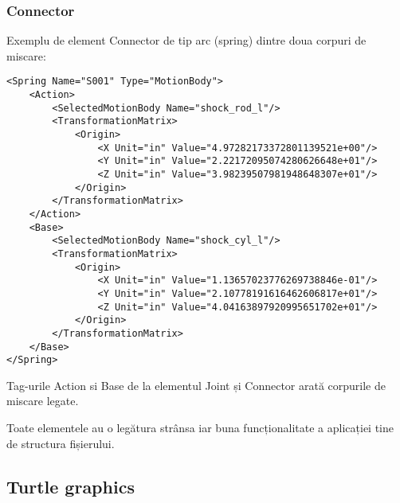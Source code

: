 \subsubsection{Connector}
Exemplu de element Connector de tip arc (spring) dintre doua corpuri de miscare:

\lstset{language=XML}
\begin{lstlisting}
<Spring Name="S001" Type="MotionBody">
    <Action>
        <SelectedMotionBody Name="shock_rod_l"/>
        <TransformationMatrix>
            <Origin>
                <X Unit="in" Value="4.97282173372801139521e+00"/>
                <Y Unit="in" Value="2.22172095074280626648e+01"/>
                <Z Unit="in" Value="3.98239507981948648307e+01"/>
            </Origin>
        </TransformationMatrix>
    </Action>
    <Base>
        <SelectedMotionBody Name="shock_cyl_l"/>
        <TransformationMatrix>
            <Origin>
                <X Unit="in" Value="1.13657023776269738846e-01"/>
                <Y Unit="in" Value="2.10778191616462606817e+01"/>
                <Z Unit="in" Value="4.04163897920995651702e+01"/>
            </Origin>
        </TransformationMatrix>
    </Base>
</Spring>
\end{lstlisting}

Tag-urile Action si Base de la elementul Joint și Connector arată corpurile de miscare legate.

Toate elementele au o legătura strânsa iar buna funcționalitate a aplicației tine de structura fișierului.

\subsection{Turtle graphics}
